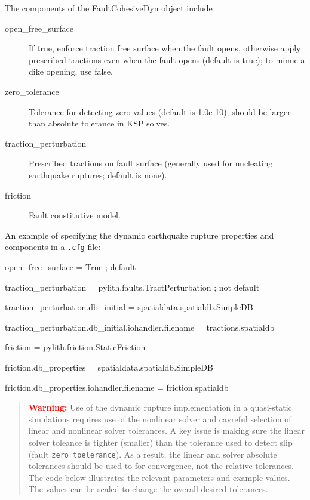 The components of the FaultCohesiveDyn object include
\begin{description}
\item [{open\_free\_surface}] If true, enforce traction free surface when
the fault opens, otherwise apply prescribed tractions even when the
fault opens (default is true); to mimic a dike opening, use false.
\item [{zero\_tolerance}] Tolerance for detecting zero values (default
is 1.0e-10); should be larger than absolute tolerance in KSP solves.
\item [{traction\_perturbation}] Prescribed tractions on fault surface
(generally used for nucleating earthquake ruptures; default is none).
\item [{friction}] Fault constitutive model.
\end{description}
An example of specifying the dynamic earthquake rupture properties
and components in a \texttt{.cfg} file:
\begin{lyxcode}

open\_free\_surface = True ; default

traction\_perturbation = pylith.faults.TractPerturbation ; not default

traction\_perturbation.db\_initial = spatialdata.spatialdb.SimpleDB

traction\_perturbation.db\_initial.iohandler.filename = tractions.spatialdb

friction = pylith.friction.StaticFriction

friction.db\_properties = spatialdata.spatialdb.SimpleDB

friction.db\_properties.iohandler.filename = friction.spatialdb\end{lyxcode}
\begin{quote}
\textbf{\textcolor{red}{Warning:}}\textbf{ }Use of the dynamic rupture
implementation in a quasi-static simulations requires use of the nonlinear
solver and cavreful selection of linear and nonlinear solver tolerances.
A key issue is making sure the linear solver toleance is tighter (smaller)
than the tolerance used to detect slip (fault \texttt{zero\_toelerance}).
As a result, the linear and solver absolute tolerances should be used
to for convergence, not the relative tolerances. The code below illustrates
the relevant parameters and example values. The values can be scaled
to change the overall desired tolerances.\end{quote}
